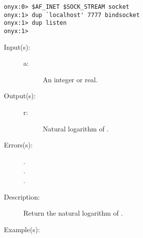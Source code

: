 \begin{description}
\begin{description}
\begin{verbatim}
onyx:0> $AF_INET $SOCK_STREAM socket
onyx:1> dup `localhost' 7777 bindsocket
onyx:1> dup listen
onyx:1>
		\end{verbatim}
	\end{description}
\label{systemdict:ln}
\item[{\onyxop{a}{ln}{r}}: ]
	\begin{description}\item[]
	\item[Input(s): ]
		\begin{description}\item[]
		\item[a: ]
			An integer or real.
		\end{description}
	\item[Output(s): ]
		\begin{description}\item[]
		\item[r: ]
			Natural logarithm of .
		\end{description}
	\item[Errors(s): ]
		\begin{description}\item[]
		\item[.]
		\item[.]
		\item[.]
		\end{description}
	\item[Description: ]
		Return the natural logarithm of .
	\item[Example(s): ]\begin{verbatim}


\end{verbatim}
\end{description}
\end{description}
